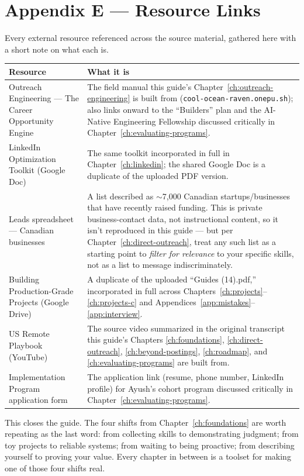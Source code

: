 \section{Appendix E --- Resource Links}
\label{app:links}

Every external resource referenced across the source material, gathered here with a short note on what each is.

\begin{longtable}{p{} p{}}
\toprule
\textbf{Resource} & \textbf{What it is} \\
\midrule
\endhead
Outreach Engineering --- The Career Opportunity Engine & The field manual this guide's Chapter~\ref{ch:outreach-engineering}
is built from (\texttt{cool-ocean-raven.onepu.sh}); also links onward to the ``Builders'' plan and the AI-Native
Engineering Fellowship discussed critically in Chapter~\ref{ch:evaluating-programs}. \\
LinkedIn Optimization Toolkit (Google Doc) & The same toolkit incorporated in full in Chapter~\ref{ch:linkedin};
the shared Google Doc is a duplicate of the uploaded PDF version. \\
Leads spreadsheet --- Canadian businesses & A list described as $\sim$7,000 Canadian startups/businesses that
have recently raised funding. This is private business-contact data, not instructional content, so it isn't
reproduced in this guide --- but per Chapter~\ref{ch:direct-outreach}, treat any such list as a starting point to
\emph{filter for relevance} to your specific skills, not as a list to message indiscriminately. \\
Building Production-Grade Projects (Google Drive) & A duplicate of the uploaded ``Guides (14).pdf,'' incorporated
in full across Chapters~\ref{ch:projects}--\ref{ch:projects-c} and Appendices~\ref{app:mistakes}--\ref{app:interview}.
\\
US Remote Playbook (YouTube) & The source video summarized in the original transcript this guide's Chapters
\ref{ch:foundations}, \ref{ch:direct-outreach}, \ref{ch:beyond-postings}, \ref{ch:roadmap}, and
\ref{ch:evaluating-programs} are built from. \\
Implementation Program application form & The application link (resume, phone number, LinkedIn profile) for
Ayush's cohort program discussed critically in Chapter~\ref{ch:evaluating-programs}. \\
\bottomrule
\end{longtable}

\begin{keytakeaway}
This closes the guide. The four shifts from Chapter~\ref{ch:foundations} are worth repeating as the last word:
from collecting skills to demonstrating judgment; from toy projects to reliable systems; from waiting to being
proactive; from describing yourself to proving your value. Every chapter in between is a toolset for making one
of those four shifts real.
\end{keytakeaway}

